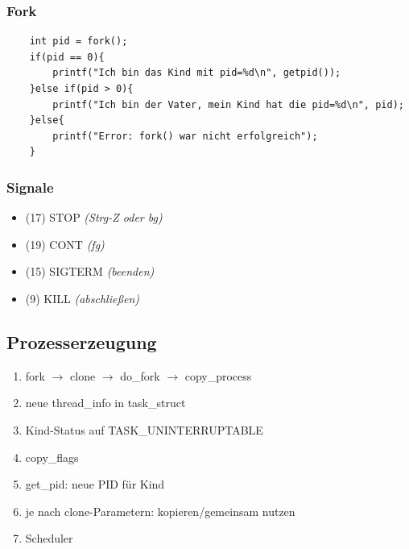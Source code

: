 \subsubsection{Fork}
\begin{lstlisting}
    int pid = fork();
    if(pid == 0){
        printf("Ich bin das Kind mit pid=%d\n", getpid());
    }else if(pid > 0){
        printf("Ich bin der Vater, mein Kind hat die pid=%d\n", pid);
    }else{
        printf("Error: fork() war nicht erfolgreich");
    }
\end{lstlisting}

\subsubsection{Signale}
\begin{itemize}
    \item (17) STOP \textit{(Strg-Z oder bg)}
    \item (19) CONT \textit{(fg)}
    \item (15) SIGTERM \textit{(beenden)}
    \item (9) KILL \textit{(abschließen)}
\end{itemize}

\subsection{Prozesserzeugung}
\begin{enumerate}
    \item fork $\rightarrow$ clone $\rightarrow$ do\_fork $\rightarrow$ copy\_process
    \item neue thread\_info in task\_struct
    \item Kind-Status auf TASK\_UNINTERRUPTABLE
    \item copy\_flags
    \item get\_pid: neue PID für Kind
    \item je nach clone-Parametern: kopieren/gemeinsam nutzen
    \item Scheduler
\end{enumerate}